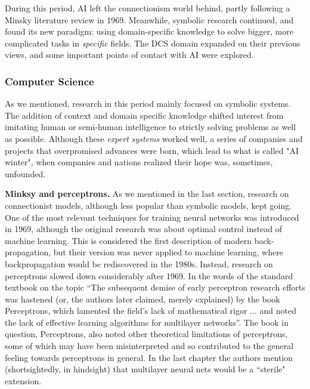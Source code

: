 \documentclass[../main.tex]{subfiles}
\begin{document}
During this period, AI left the connectionism world behind, partly following a Minsky literature review in 1969. Meanwhile, symbolic research continued, and found its new paradigm: using domain-specific knowledge to solve bigger, more complicated tasks in \textit{specific} fields. The DCS domain expanded on their previous views, and some important points of contact with AI were explored.

\subsubsection{Computer Science}
As we mentioned, research in this period mainly focused on symbolic systems. The addition of context and domain specific knowledge shifted interest from imitating human or semi-human intelligence to strictly solving problems as well as possible. Although these \textit{expert systems} worked well, a series of companies and projects that overpromised advances were born, which lead to what is called "AI winter", when companies and nations realized their hope was, sometimes, unfounded.

\vspace{4pt}
\textbf{Minksy and perceptrons.}
As we mentioned in the last section, research on connectionist models, although less popular than symbolic models, kept going. One of the most relevant techniques for training neural networks was introduced in 1969\cite{brysonAppliedOptimalControl1969}, although the original research was about optimal control instead of machine learning. This is considered the first description of modern back-propagation\cite{lecunTheoreticalFrameworkBackpropagation1988}, but their version was never applied to machine learning, where backpropagation would be rediscovered in the 1980s.
Instead, research on perceptrons slowed down considerably after 1969. In the words of the standard textbook on the topic \enquote{The subsequent demise of early perceptron research efforts was hastened (or, the authors later claimed, merely explained) by the book Perceptrons, which lamented the field's lack of mathematical rigor ... and noted the lack of effective learning algorithms for multilayer networks}. The book in question, Perceptrons\cite{minskyPerceptronIntroductionComputational1969}, also noted other theoretical limitations of perceptrons, some of which may have been misinterpreted and so contributed to the general feeling towards perceptrons in general. In the last chapter the authors mention (shortsightedly, in hindsight) that multilayer neural nets would be a ``sterile" extension.
\end{document}
